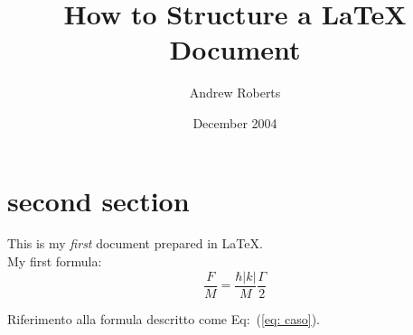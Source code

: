 

\title{How to Structure a LaTeX Document}
\author{Andrew Roberts}
\date{December 2004}


\maketitle
\tableofcontents


\begin{abstract}
	\lipsum[1-2]
\end{abstract}


\section{second section}
This is my \emph{first} document prepared in \LaTeX.\\
My first formula:
\begin{equation}
\frac{F}{M} = \frac{\hbar |k| }{M} \frac{\Gamma}{2}
\label{eq: caso}
\end{equation}

Riferimento alla formula descritto come Eq:~(\ref{eq: caso}).

